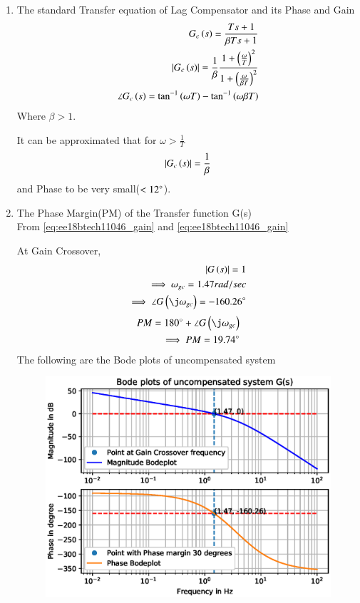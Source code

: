 \begin{enumerate}[label=\thesection.\arabic*.,ref=\thesection.\theenumi]
\item The standard Transfer equation of Lag Compensator and its Phase and Gain\\
\solution
\begin{align}
G_{c}\left(s\right) = \frac{Ts+1}{\beta Ts+1}
\label{eq:ee18btech11046_comp}
\\
\left\vert G_{c}\left(s\right)\right\vert = \frac{1}{\beta}\frac{1+\left(\frac{\omega}{T}\right)^{2}}{1+\left(\frac{\omega}{\beta T}\right)^{2}}
\label{eq:ee18btech11046_compGain}
\\
\angle G_{c}\left(s\right) = \tan^{-1}\left(\omega T\right)-\tan^{-1}\left(\omega \beta T\right)
\label{eq:ee18btech11046_compPhase}
\end{align}
Where $\beta > 1$.

It can be approximated that for $\omega > \frac{1}{T}$  
\begin{align}
\left\vert G_{c}\left(s\right)\right\vert = \frac{1}{\beta}
\label{eq:ee18btech11046_compGainapprox}
\end{align}
and Phase to be very small($<12\degree$).


\item The Phase Margin(PM) of the Transfer function G(s)\\
\solution
From \eqref{eq:ee18btech11046_gain} and \eqref{eq:ee18btech11046_gain}

At Gain Crossover,
\begin{align}
\abs{G\brak{s}} = 1
\\
\implies
\omega_{gc} = 1.47rad/sec
\\
\implies
\angle G\brak{\j \omega_{gc}} = -160.26\degree
\end{align}
\begin{align}
PM = 180\degree + \angle G\brak{\j \omega_{gc}}
\\
\implies
PM = 19.74\degree
\end{align}
The following are the Bode plots of uncompensated system
\begin{figure}[!h]
\centering
  \includegraphics[width=\columnwidth]{./figs/ee18btech11046_1.eps}
\caption{}
\label{fig:ee18btech11046_uncompensated} 
\end{figure}
%


\end{enumerate}
